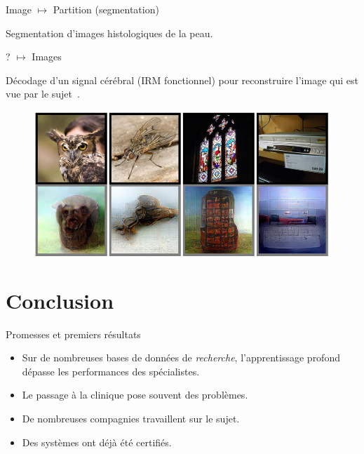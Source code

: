 \documentclass[xcolor=pdftex,dvipsnames,table,mathserif]{beamer}
\begin{document}
\begin{frame}{Image $\longmapsto$ Partition (segmentation)}

Segmentation d'images histologiques de la peau.

\end{frame}


\begin{frame}{? $\longmapsto$ Images}

Décodage d'un signal cérébral (IRM fonctionnel) pour reconstruire l'image qui est vue par le sujet~\cite{shen_deep_2019}.

\begin{figure}[ht]
  \centering
  \includegraphics[width=\textwidth]{im_from_fMRI}
\end{figure}


\end{frame}



\section{Conclusion}

\begin{frame}{Promesses et premiers résultats}

\begin{itemize}[<+->]
\item Sur de nombreuses bases de données de \textit{recherche}, l'apprentissage profond dépasse les performances des spécialistes.
\item Le passage à la clinique pose souvent des problèmes.
\item De nombreuses compagnies travaillent sur le sujet.
\item Des systèmes ont déjà été certifiés.
\end{itemize}


\end{frame}
\end{document}
